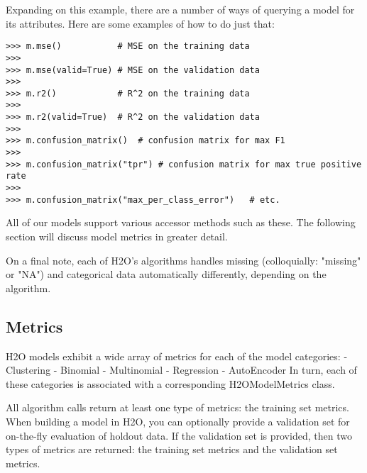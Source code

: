 Expanding on this example, there are a number of ways of querying a model for its attributes. Here are some examples of how to do just that:
\begin{lstlisting}[style=python]
>>> m.mse()           # MSE on the training data
>>>
>>> m.mse(valid=True) # MSE on the validation data
>>>
>>> m.r2()            # R^2 on the training data
>>>
>>> m.r2(valid=True)  # R^2 on the validation data
>>>
>>> m.confusion_matrix()  # confusion matrix for max F1
>>>
>>> m.confusion_matrix("tpr") # confusion matrix for max true positive rate
>>>
>>> m.confusion_matrix("max_per_class_error")   # etc.
\end{lstlisting}

All of our models support various accessor methods such as these. The following section will discuss model metrics in greater detail.

On a final note, each of H2O's algorithms handles missing (colloquially: "missing" or "NA") and categorical data automatically differently, depending on the algorithm. 

\subsection{Metrics}

H2O models exhibit a wide array of metrics for each of the model categories: - Clustering - Binomial - Multinomial - Regression - AutoEncoder In turn, each of these categories is associated with a corresponding H2OModelMetrics class.

All algorithm calls return at least one type of metrics: the training set metrics. When building a model in H2O, you can optionally provide a validation set for on-the-fly evaluation of holdout data. If the validation set is provided, then two types of metrics are returned: the training set metrics and the validation set metrics.

